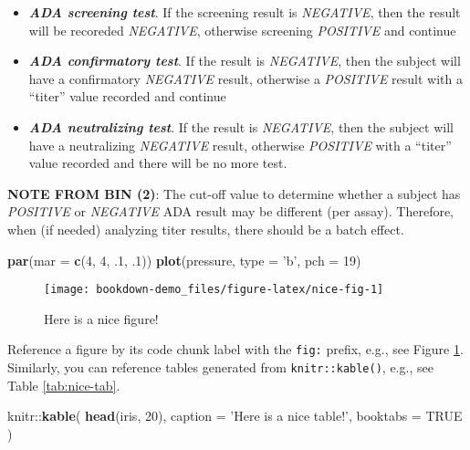 \documentclass[]{book}
\newenvironment{Shaded}{\begin{snugshade}}{\end{snugshade}}
\newcommand{\KeywordTok}[1]{\textcolor[rgb]{0.13,0.29,0.53}{\textbf{{#1}}}}
\newcommand{\DataTypeTok}[1]{\textcolor[rgb]{0.13,0.29,0.53}{{#1}}}
\newcommand{\DecValTok}[1]{\textcolor[rgb]{0.00,0.00,0.81}{{#1}}}
\newcommand{\StringTok}[1]{\textcolor[rgb]{0.31,0.60,0.02}{{#1}}}
\newcommand{\OtherTok}[1]{\textcolor[rgb]{0.56,0.35,0.01}{{#1}}}
\newcommand{\NormalTok}[1]{{#1}}
\providecommand{\tightlist}{%
  \setlength{\itemsep}{0pt}\setlength{\parskip}{0pt}}
\begin{document}
\begin{itemize}
\tightlist
\item
  \textbf{\emph{ADA screening test}}. If the screening result is
  \emph{NEGATIVE}, then the result will be recoreded \emph{NEGATIVE},
  otherwise screening \emph{POSITIVE} and continue
\item
  \textbf{\emph{ADA confirmatory test}}. If the result is
  \emph{NEGATIVE}, then the subject will have a confirmatory
  \emph{NEGATIVE} result, otherwise a \emph{POSITIVE} result with a
  ``titer'' value recorded and continue
\item
  \textbf{\emph{ADA neutralizing test}}. If the result is
  \emph{NEGATIVE}, then the subject will have a neutralizing
  \emph{NEGATIVE} result, otherwise \emph{POSITIVE} with a ``titer''
  value recorded and there will be no more test.
\end{itemize}

\textbf{NOTE FROM BIN (2)}: The cut-off value to determine whether a
subject has \emph{POSITIVE} or \emph{NEGATIVE} ADA result may be
different (per assay). Therefore, when (if needed) analyzing titer
results, there should be a batch effect.

\begin{Shaded}
\begin{Highlighting}[]
\KeywordTok{par}\NormalTok{(}\DataTypeTok{mar =} \KeywordTok{c}\NormalTok{(}\DecValTok{4}\NormalTok{, }\DecValTok{4}\NormalTok{, .}\DecValTok{1}\NormalTok{, .}\DecValTok{1}\NormalTok{))}
\KeywordTok{plot}\NormalTok{(pressure, }\DataTypeTok{type =} \StringTok{'b'}\NormalTok{, }\DataTypeTok{pch =} \DecValTok{19}\NormalTok{)}
\end{Highlighting}
\end{Shaded}

\begin{figure}

{\centering \texttt{[image: bookdown-demo\_files/figure-latex/nice-fig-1]} 

}

\caption{Here is a nice figure!}\label{fig:nice-fig}
\end{figure}

Reference a figure by its code chunk label with the \texttt{fig:}
prefix, e.g., see Figure \ref{fig:nice-fig}. Similarly, you can
reference tables generated from \texttt{knitr::kable()}, e.g., see Table
\ref{tab:nice-tab}.

\begin{Shaded}
\begin{Highlighting}[]
\NormalTok{knitr::}\KeywordTok{kable}\NormalTok{(}
  \KeywordTok{head}\NormalTok{(iris, }\DecValTok{20}\NormalTok{), }\DataTypeTok{caption =} \StringTok{'Here is a nice table!'}\NormalTok{,}
  \DataTypeTok{booktabs =} \OtherTok{TRUE}
\NormalTok{)}
\end{Highlighting}
\end{Shaded}
\end{document}
